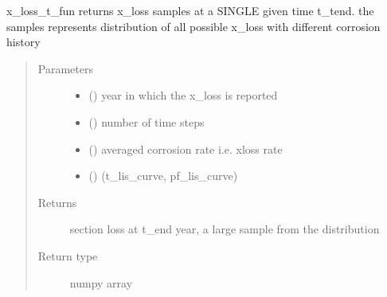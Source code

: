 \documentclass[letterpaper,10pt,english]{sphinxmanual}
\begin{document}

\begin{fulllineitems}
\label{\detokenize{corrosion:corrosion.x_loss_t_fun}}
\sphinxAtStartPar
x\_loss\_t\_fun returns x\_loss samples at a SINGLE given time t\_tend. the samples represents distribution of all possible x\_loss with
different corrosion history
\begin{quote}\begin{description}
\item[{Parameters}] \leavevmode\begin{itemize}
\item {} 
\sphinxAtStartPar
{} (\sphinxstyleliteralemphasis{\sphinxupquote{, }}) \textendash{} year in which the x\_loss is reported

\item {} 
\sphinxAtStartPar
{} () \textendash{} number of time steps

\item {} 
\sphinxAtStartPar
{} () \textendash{} averaged corrosion rate i.e. x\sphinxhyphen{}loss rate

\item {} 
\sphinxAtStartPar
{} () \textendash{} (t\_lis\_curve, pf\_lis\_curve)

\end{itemize}

\item[{Returns}] \leavevmode
\sphinxAtStartPar
section loss at t\_end year, a large sample from the distribution

\item[{Return type}] \leavevmode
\sphinxAtStartPar
numpy array

\end{description}\end{quote}

\end{fulllineitems}
\end{document}
